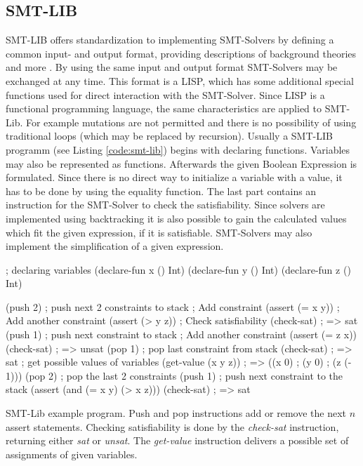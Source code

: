 \subsection{SMT-LIB}
SMT-LIB offers standardization to implementing SMT-Solvers by defining a common input- and output format, providing descriptions of background theories and more \cite{cokSMTLIBv2LanguageTools}. %
By using the same input and output format SMT-Solvers may be exchanged at any time. 
This format is a LISP, which has some additional special functions used for direct interaction with the SMT-Solver. Since LISP is a functional programming language, the same characteristics are applied to SMT-Lib.
For example mutations are not permitted and there is no possibility of using traditional loops (which may be replaced by recursion).
Usually a SMT-LIB programm (see Listing \ref{code:smt-lib}) begins with declaring functions. Variables may also be represented as functions. 
Afterwards the given Boolean Expression is formulated. Since there is no direct way to initialize a variable with a value, it has to be done by using the equality function. 
The last part contains an instruction for the SMT-Solver to check the satisfiability. 
Since solvers are implemented using backtracking it is also possible to gain the calculated values which fit the given expression, if it is satisfiable. 
SMT-Solvers may also implement the simplification of a given expression.

\begin{program}
	\begin{LispCode}
; declaring variables
(declare-fun x () Int)
(declare-fun y () Int)
(declare-fun z () Int)

(push 2) ; push next 2 constraints to stack
; Add constraint
(assert (= x y))
; Add another constraint
(assert (> y z))
; Check satisfiability
(check-sat)
; => sat
(push 1) ; push next constraint to stack
; Add another constraint
(assert (= z x))
(check-sat)
; => unsat
(pop 1) ; pop last constraint from stack
(check-sat)
; => sat
; get possible values of variables
(get-value (x y z))
; => ((x 0)
;     (y 0)
;     (z (- 1)))
(pop 2) ; pop the last 2 constraints
(push 1) ; push next constraint to the stack
(assert (and (= x y) (> x z)))
(check-sat)
; => sat\end{LispCode}
	\caption{SMT-Lib example program. Push and pop instructions add or remove the next $n$ assert statements. Checking satisfiability is done by the \emph{check-sat} instruction, returning either \emph{sat} or \emph{unsat}. The \emph{get-value} instruction delivers a possible set of assignments of given variables. }
	\label{code:smt-lib}
\end{program}



